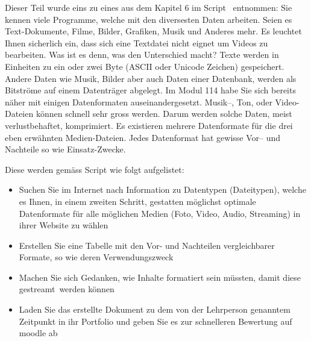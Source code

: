 
\label{einleitung}
\setcounter{page}{1}
\normalsize
Dieser Teil wurde eins zu eines aus dem Kapitel 6 im Script~\cite{sterchi} entnommen:\newline\newline
Sie kennen viele Programme, welche mit den diversesten Daten arbeiten.
Seien es Text-Dokumente, Filme, Bilder, Grafiken, Musik und Anderes mehr.\newline\newline
Es leuchtet Ihnen sicherlich ein, dass sich eine Textdatei nicht eignet um Videos zu bearbeiten.
Was ist es denn, was den Unterschied macht?
Texte werden in Einheiten zu ein oder zwei Byte (ASCII oder Unicode Zeichen) gespeichert.
Andere Daten wie Musik, Bilder aber auch Daten einer Datenbank, werden als Bitströme auf einem Datenträger abgelegt.
Im Modul 114 habe Sie sich bereits näher mit einigen Datenformaten auseinandergesetzt.\newline\newline
Musik–, Ton, oder Video-Dateien können schnell sehr gross werden.
Darum werden solche Daten, meist verlustbehaftet, komprimiert.
Es existieren mehrere Datenformate für die drei eben erwähnten Medien-Dateien.
Jedes Datenformat hat gewisse Vor– und Nachteile so wie Einsatz-Zwecke.

Diese werden gemäss Script wie folgt aufgelistet:
\begin{itemize}
    \item Suchen Sie im Internet nach Information zu Datentypen (Dateitypen), welche es Ihnen, in einem
    zweiten Schritt, gestatten möglichst optimale Datenformate für alle möglichen Medien (Foto,
    Video, Audio, Streaming) in ihrer Website zu wählen
    \item Erstellen Sie eine Tabelle mit den Vor- und Nachteilen vergleichbarer Formate, so wie deren
    Verwendungszweck
    \item Machen Sie sich Gedanken, wie Inhalte formatiert sein müssten, damit diese \dq gestreamt\dq~werden können
    \item Laden Sie das erstellte Dokument zu dem von der Lehrperson genanntem Zeitpunkt in ihr Portfolio
    und geben Sie es zur schnelleren Bewertung auf moodle ab
\end{itemize}

